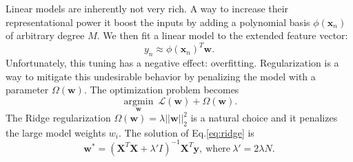 \documentclass[10pt,conference,compsocconf]{IEEEtran}
\newcommand{\xx}{\mathbf{x}}
\newcommand{\yy}{\mathbf{y}}
\newcommand{\ww}{\mathbf{w}}
\newcommand{\XX}{\mathbf{X}}
\newcommand{\Lagr}{\mathcal{L}}
\newcommand{\argmin}[1]{\underset{#1}{\operatorname{argmin}}}
\begin{document}
Linear models are inherently not very rich. A way to increase their representational power  it boost the inputs by adding a polynomial basis $\phi(\xx_n)$ of arbitrary degree $M$.
We then fit a linear model to the extended feature vector:
$$
y_n \approx \phi(\xx_n)^T\ww.
$$
Unfortunately, this tuning has a negative effect: overfitting. Regularization is a
way to mitigate this undesirable behavior by penalizing the model with a parameter $\Omega(\ww)$. The optimization problem becomes
\begin{equation}\label{eq:ridge}
\argmin{\ww} \ \Lagr(\ww) + \Omega(\ww).
\end{equation}
The Ridge regularization $\Omega(\ww) = \lambda || \ww ||_2^2$ is a natural choice and it penalizes the large model weights $w_i$. The solution of Eq.\ref{eq:ridge} is
$$
\ww^* = (\XX^T \XX + \lambda' I)^{-1} \XX^T \yy, \ \text{where} \ \lambda' = 2\lambda N.
$$
\end{document}
